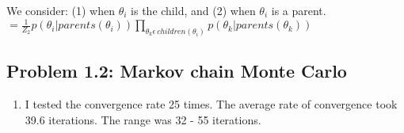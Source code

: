 \documentclass{article}
\begin{document}
\begin{enumerate}[label=(\alph*)]

We consider: (1) when $\theta_i$ is the child, and (2) when $\theta_i$ is a parent. \\

$= \frac{1}{Z_2}p(\theta_i|parents(\theta_i)) \prod_{\theta_k \epsilon \, children{(\theta_i)}}p(\theta_k|parents(\theta_k))$



\end{enumerate}

\subsection*{Problem 1.2: Markov chain Monte Carlo}

\begin{enumerate}[label=(d)]

\item I tested the convergence rate 25 times. The average rate of convergence took 39.6 iterations.
The range was 32 - 55 iterations.

\end{enumerate}
\end{document}
